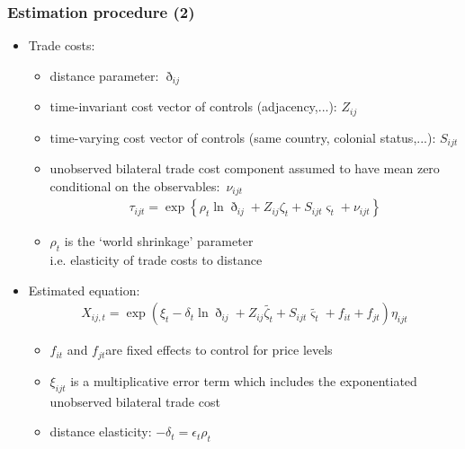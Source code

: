 \documentclass{beamer}
\begin{document}
\begin{frame}[plain]\frametitle{Estimation procedure (2)}
\begin{itemize}
\item Trade costs: 
	\begin{itemize}
	\item distance parameter: $\eth_{ij}$
	\item time-invariant cost vector of controls (adjacency,...): $Z_{ij}$
	\item time-varying cost vector of controls (same country, colonial status,...): $S_{ijt}$
	\item unobserved bilateral trade cost component assumed to have mean zero conditional on the observables: $\nu_{ijt}$ 
\begin{gather}
\tau_{ijt}=\exp\left\{\rho_t\ln{\eth_{ij}}+{Z_{ij}}\zeta_{t}+{S_{ijt}}\varsigma_{t}+\nu_{ijt}\right\} \nonumber
\end{gather}
	\item $\rho_t$ is the `world shrinkage' parameter \\ 
\hspace{1cm} i.e. elasticity of trade costs to distance
	\end{itemize}
\item Estimated equation:
\begin{gather}
X_{ij,t}=\exp{\left(\xi_t-\delta_{t}\ln{\eth_{ij}}+{Z_{ij}}\tilde{\zeta_{t}}+{S_{ijt}}\tilde{\varsigma_{t}}+f_{it}+f_{jt}\right)\eta_{ijt}} \nonumber
\end{gather}
	\begin{itemize}
	\item $f_{it}$ and $f_{jt}$are fixed effects to control for price levels
	\item $\xi_{ijt}$ is a multiplicative error term which includes the exponentiated unobserved bilateral trade cost
	\item distance elasticity: $-\delta_{t}=\epsilon_{t}\rho_t$
	\end{itemize}
\end{itemize}
\end{frame}
\end{document}
